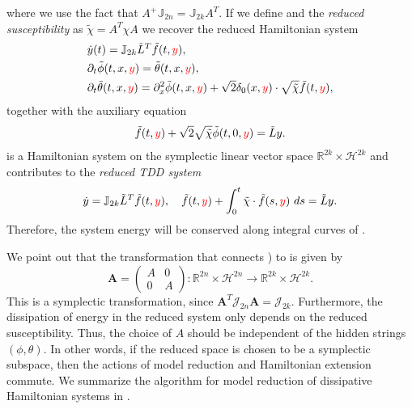 where we use the fact that $A^+\mathbb J_{2n} = \mathbb{J}_{2k} A^T$. If we define
\edit{
\[
	f = A \tilde f,\quad \phi = A \tilde \phi,\quad \theta = A\tilde \theta, \quad \tilde L = A^T L A,
\]
}
and the \emph{reduced susceptibility} as $\tilde \chi = A^T \chi A$ we recover the reduced Hamiltonian system
\begin{subequations}
\begin{align}
		\label{p3.eq:3.12.a} & \dot{y}(t) = \mathbb J_{2k} {\tilde L}^T \tilde f(t,{\color{red} y}), \\
		\label{p3.eq:3.12.b} & \partial_t \tilde \phi(t,x,{\color{red} y}) = \tilde \theta(t,x,{\color{red} y}),\\
		\label{p3.eq:3.12.c} & \partial_t \tilde \theta(t,x,{\color{red} y}) = \partial_x^2 \tilde \phi(t,x,{\color{red} y}) + \sqrt 2 \delta_0(x,{\color{red} y}) \cdot \sqrt{\tilde \chi}  \tilde f(t,{\color{red} y}),
\end{align}
\end{subequations}
together with the auxiliary equation
\begin{equation} \label{p3.eq:3.13}
	\tilde f(t,{\color{red} y}) + \sqrt{2} \sqrt{\tilde \chi} \tilde \phi(t,0,{\color{red} y}) = \tilde L y.
\end{equation}
 is a Hamiltonian system on the symplectic linear vector space $\mathbb R^{2k} \times \mathcal H^{2k}$ and contributes to the \emph{reduced TDD system}
\begin{equation} \label{p3.eq:3.14}
	\dot {y} = \mathbb J_{2k} \tilde L^T \tilde f(t,\edit{y}), \quad \tilde f(t,\edit{y}) + \int_0^t \tilde \chi\cdot \tilde f(s,\edit{y})\ ds = \tilde L y.
\end{equation}
Therefore, the system energy will be conserved along integral curves of .

We point out that the transformation that connects ) to  is given by
\begin{equation}
	\mathbf A = \begin{pmatrix}
		A& 0 \\
		0& A
	\end{pmatrix} : \mathbb R^{2n} \times \mathcal H^{2n} \to \mathbb R^{2k} \times \mathcal H^{2k}.
\end{equation}
This is a symplectic transformation, since $\mathbf A^T \mathcal J_{2n} \mathbf A = \mathcal J_{2k}$. Furthermore, the dissipation of energy in the reduced system only depends on the reduced susceptibility. Thus, the choice of $A$ should be independent of the hidden strings $(\phi, \theta)$. In other words, if the reduced space is chosen to be a symplectic subspace, then the actions of model reduction and Hamiltonian extension commute. We summarize the algorithm for model reduction of dissipative Hamiltonian systems in .

